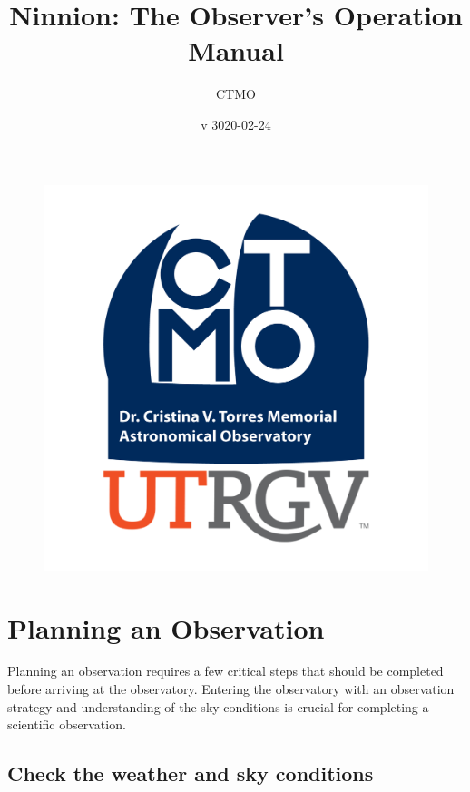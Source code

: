 \documentclass{article}
\title{Ninnion: The Observer's Operation Manual}
\author{CTMO}
\date{v 3020-02-24}
\begin{document}
	
	\maketitle
	
	\begin{figure}[b]
		\centering
		\includegraphics[scale=0.2]{CTMO_transparent.png}
	\end{figure}
	
	\newpage
	\tableofcontents
	
	\newpage
	\section{Planning an Observation}
	
		Planning an observation requires a few critical steps that should be completed before arriving at the observatory. Entering the observatory with an observation strategy and understanding of the sky conditions is crucial for completing a scientific observation.
	
		\subsection{Check the weather and sky conditions}
	
\end{document}
